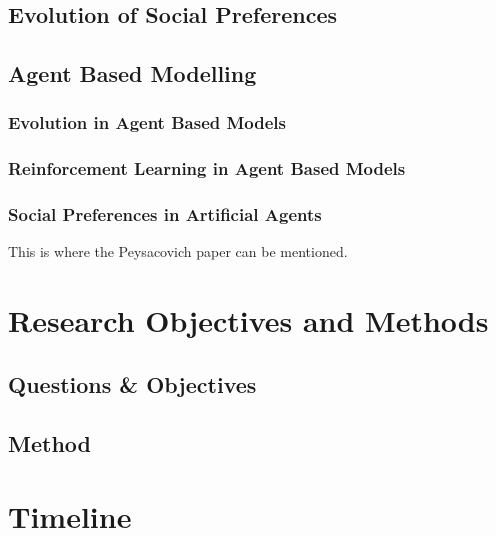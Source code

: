 \documentclass[12pt]{article}
\begin{document}
\subsection{Evolution of Social Preferences}
\subsection{Agent Based Modelling}
\subsubsection{Evolution in Agent Based Models}
\subsubsection{Reinforcement Learning in Agent Based Models}
\subsubsection{Social Preferences in Artificial Agents}
This is where the Peysacovich paper can be mentioned.
\section{Research Objectives and Methods}
\subsection{Questions \& Objectives}
\subsection{Method}
\section{Timeline}


\end{document}
